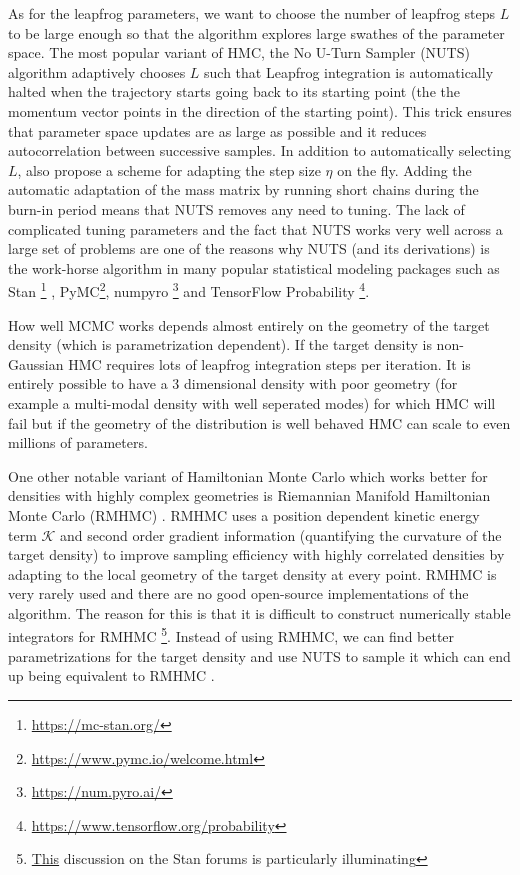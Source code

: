 \documentclass[12pt,dvipsnames]{report}
\begin{document}
As for the leapfrog parameters, we want to choose the number of leapfrog steps $L$ to be 
large enough so that the algorithm explores large swathes of the parameter space.
The most popular variant of HMC, the No U-Turn Sampler (NUTS) algorithm 
\citep{arXiv:1111.4246} adaptively chooses $L$ such that Leapfrog integration is 
automatically halted when the trajectory starts going back to its starting point (the
the momentum vector points in the direction of the starting point).
This trick ensures that parameter space updates are as large as possible and it 
reduces autocorrelation between successive samples.
In addition to automatically selecting $L$, \citet{arXiv:1111.4246} also propose a 
scheme for adapting the step size $\eta$ on the fly. Adding the automatic adaptation
of the mass matrix by running short chains during the burn-in period means that 
NUTS removes any need to tuning. The lack of complicated tuning parameters and 
the fact that NUTS works very well across a large set of problems are one of the 
reasons why NUTS (and its derivations) is the work-horse algorithm 
in many popular statistical modeling packages such as \textsf{Stan}
\footnote{\url{https://mc-stan.org/}} \citep{2017JSS....76....1C}, 
\textsf{PyMC}\footnote{\url{https://www.pymc.io/welcome.html}}, \textsf{numpyro}
\footnote{\url{https://num.pyro.ai/}} and \textsf{TensorFlow Probability}
\footnote{\url{https://www.tensorflow.org/probability}}. 

How well MCMC works depends almost entirely on the geometry of the target density
(which is parametrization dependent). If the target density is non-Gaussian 
HMC requires lots of leapfrog integration steps per iteration. It is entirely 
possible to have a 3 dimensional density with poor geometry (for example 
a multi-modal density with well seperated modes) for which HMC will 
fail but if the geometry of the distribution is well behaved HMC can scale to 
even millions of parameters.


One other notable variant of Hamiltonian Monte Carlo which works better for 
densities with highly complex geometries is 
Riemannian Manifold Hamiltonian Monte Carlo (RMHMC) \citep{girolami2011}.
RMHMC uses a position dependent kinetic energy term $\mathcal{K}$ and second order 
gradient information (quantifying the curvature of the target density) to improve 
sampling efficiency with highly correlated densities by adapting to the local geometry 
of the target density at every point. RMHMC is very rarely used and there are no 
good open-source implementations of the algorithm. The reason for this is that 
it is  difficult to construct numerically stable integrators for RMHMC
\footnote{\href{https://discourse.mc-stan.org/t/riemann-manifold-hmc-in-stan/19466/5}{This}
discussion on the \textsf{Stan} forums is particularly illuminating}.
Instead of using RMHMC, we can find better parametrizations for the target density
and use NUTS to sample it which can end up being equivalent to RMHMC 
\citep{arXiv:1910.09407}.
\end{document}
